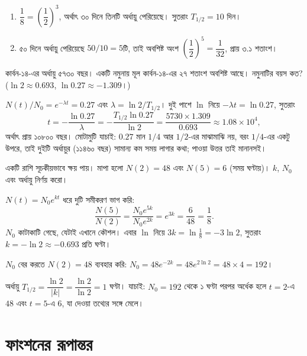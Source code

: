 \documentclass[11pt]{article}
\begin{document}
\begin{sol}
\begin{enumerate}
  \item $\dfrac{1}{8} = \left( \dfrac{1}{2} \right)^{3}$, অর্থাৎ ৩০ দিনে তিনটি
        অর্ধায়ু পেরিয়েছে। সুতরাং $T_{1/2} = 10$ দিন।
  \item ৫০ দিনে অর্ধায়ু পেরিয়েছে $50/10 = 5$টি, তাই অবশিষ্ট অংশ
        $\left( \dfrac{1}{2} \right)^{5} = \dfrac{1}{32}$, প্রায় ৩.১ শতাংশ।
\end{enumerate}
\end{sol}

 কার্বন-১৪-এর অর্ধায়ু ৫৭৩০ বছর। একটি নমুনায় মূল কার্বন-১৪-এর ২৭ শতাংশ
অবশিষ্ট আছে। নমুনাটির বয়স কত? ($\ln 2 \approx 0.693$,
$\ln 0.27 \approx -1.309$।)

\begin{sol}
$N(t)/N_{0} = e^{-\lambda t} = 0.27$ এবং $\lambda = \ln 2 / T_{1/2}$। দুই পাশে
$\ln$ নিয়ে $-\lambda t = \ln 0.27$, সুতরাং
\[
  t = -\frac{\ln 0.27}{\lambda} = -\frac{T_{1/2} \ln 0.27}{\ln 2}
    = \frac{5730 \times 1.309}{0.693} \approx 1.08 \times 10^{4} ,
\]
অর্থাৎ প্রায় ১০৮০০ বছর।
মোটামুটি যাচাই: $0.27$ মান $1/4$ আর $1/2$-এর মাঝামাঝি নয়, বরং $1/4$-এর একটু
উপরে, তাই দুইটি অর্ধায়ুর (১১৪৬০ বছর) সামান্য কম সময় লাগার কথা; পাওয়া উত্তর
তাই মানানসই।
\end{sol}

 একটি রাশি সূচকীয়ভাবে ক্ষয় পায়। মাপা হলো $N(2) = 48$ এবং $N(5) = 6$
(সময় ঘণ্টায়)। $k$, $N_{0}$ এবং অর্ধায়ু নির্ণয় করো।

\begin{sol}
$N(t) = N_{0} e^{kt}$ ধরে দুটি সমীকরণ ভাগ করি:
\[
  \frac{N(5)}{N(2)} = \frac{N_{0} e^{5k}}{N_{0} e^{2k}} = e^{3k}
  = \frac{6}{48} = \frac{1}{8} .
\]
$N_{0}$ কাটাকাটি গেছে, যেটাই এখানে কৌশল। এবার $\ln$ নিয়ে
$3k = \ln \tfrac{1}{8} = -3 \ln 2$, সুতরাং $k = -\ln 2 \approx -0.693$ প্রতি
ঘণ্টা।

$N_{0}$ বের করতে $N(2) = 48$ ব্যবহার করি:
$N_{0} = 48 e^{-2k} = 48 e^{2\ln 2} = 48 \times 4 = 192$।

অর্ধায়ু $T_{1/2} = \dfrac{\ln 2}{|k|} = \dfrac{\ln 2}{\ln 2} = 1$ ঘণ্টা।
যাচাই: $N_{0} = 192$ থেকে ১ ঘণ্টা পরপর অর্ধেক হলে $t = 2$-এ $48$ এবং $t = 5$-এ
$6$, যা দেওয়া তথ্যের সঙ্গে মেলে।
\end{sol}

\section{ফাংশনের রূপান্তর}
\end{document}
